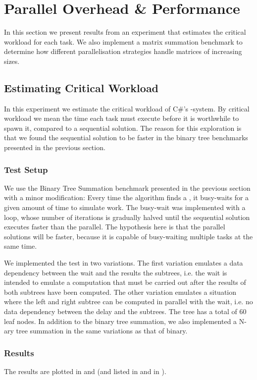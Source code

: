 \section{Parallel Overhead \& Performance}\label{sec:crit:work}
In this section we present results from an experiment that estimates the critical workload for each task. We also implement a matrix summation benchmark to determine how different parallelisation strategies handle matrices of increasing sizes.

\subsection{Estimating Critical Workload}
In this experiment we estimate the critical workload of C\#'s -system. By critical workload we mean the time each task must execute before it is worthwhile to spawn it, compared to a sequential solution. The reason for this exploration is that we found the sequential solution to be faster in the binary tree benchmarks presented in the previous section.

\subsubsection{Test Setup}
We use the Binary Tree Summation benchmark presented in the previous section with a minor modification: Every time the algorithm finds a , it busy-waits for a given amount of time to simulate work. The busy-wait was implemented with a loop, whose number of iterations is gradually halved until the sequential solution executes faster than the parallel. The hypothesis here is that the parallel solutions will be faster, because it is capable of busy-waiting multiple tasks at the same time.

We implemented the test in two variations. The first variation emulates a data dependency between the wait and the results the subtrees, i.e. the wait is intended to emulate a computation that must be carried out after the results of both subtrees have been computed. The other variation emulates a situation where the left and right subtree can be computed in parallel with the wait, i.e. no data dependency between the delay and the subtrees. The tree has a total of 60 leaf nodes. In addition to the binary tree summation, we also implemented a N-ary tree summation in the same variations as that of binary.

\subsubsection{Results}
The results are plotted in  and  (and listed in  and  in ).

